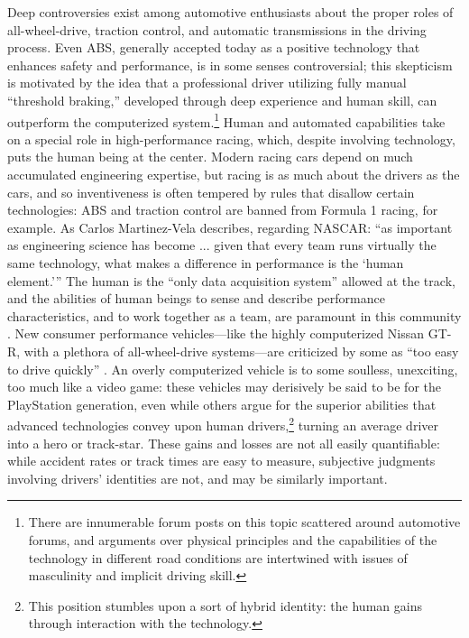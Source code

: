 Deep controversies exist among automotive
enthusiasts about the proper roles of all-wheel-drive, traction
control, and automatic transmissions in the driving process. Even ABS,
generally accepted today as a positive technology that enhances safety and
performance, is in some senses controversial; this skepticism is
motivated by the idea that 
a professional driver utilizing fully manual ``threshold braking,''
developed through deep experience and human skill, can outperform the
computerized system.\footnote{There are innumerable forum posts on
  this topic scattered around automotive forums, and arguments over
  physical principles and the capabilities of the technology in
  different road conditions are
  intertwined with issues of masculinity and implicit driving skill.}
Human and automated capabilities take on a special role in
  high-performance racing, which, despite involving technology, puts the
  human being at the center. Modern racing cars depend on
much accumulated engineering expertise, but racing is as much about
the drivers as the cars, and so inventiveness is often tempered by
rules that disallow certain technologies:  ABS and traction control are
banned from Formula 1 racing, for example. As Carlos Martinez-Vela
describes, regarding NASCAR: ``as important as engineering science has
become ... given
that every team runs virtually the same technology, what makes a
difference in performance is the `human element.''' The human is the ``only data acquisition
system'' allowed at the track, and the abilities of human beings to
sense and describe performance characteristics, and to work together
as a team, are paramount in this community \cite[p.
  178]{martinezvela}. New consumer performance vehicles---like the 
highly computerized Nissan GT-R, with a plethora of all-wheel-drive
systems---are criticized by some as ``too easy to drive quickly'' \cite{edmunds}.
An overly computerized vehicle is to some soulless, unexciting, too much like
a video game: these vehicles may derisively be said to be for the
PlayStation generation, even while others argue for the superior
abilities that advanced technologies convey upon human
drivers,\footnote{This position stumbles upon a sort of hybrid
  identity: the  human gains through
interaction with the technology.}
turning an average driver into a hero or track-star. These gains and
losses are not all easily quantifiable: while accident rates or track
times are easy to measure, subjective judgments involving drivers'
identities are not, and may be similarly important.


